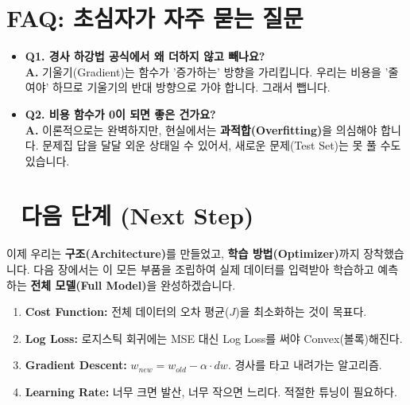 \documentclass[11pt,a4paper]{book}
\theoremstyle{definition}
\begin{document}
\section{FAQ: 초심자가 자주 묻는 질문}
\begin{itemize}
    \item \textbf{Q1. 경사 하강법 공식에서 왜 더하지 않고 빼나요?} \\
    \textbf{A.} 기울기(Gradient)는 함수가 '증가하는' 방향을 가리킵니다. 우리는 비용을 '줄여야' 하므로 기울기의 반대 방향으로 가야 합니다. 그래서 뺍니다.
    
    \item \textbf{Q2. 비용 함수가 0이 되면 좋은 건가요?} \\
    \textbf{A.} 이론적으로는 완벽하지만, 현실에서는 \textbf{과적합(Overfitting)}을 의심해야 합니다. 문제집 답을 달달 외운 상태일 수 있어서, 새로운 문제(Test Set)는 못 풀 수도 있습니다.
\end{itemize}

\section*{🔗 다음 단계 (Next Step)}
이제 우리는 \textbf{구조(Architecture)}를 만들었고, \textbf{학습 방법(Optimizer)}까지 장착했습니다. 
다음 장에서는 이 모든 부품을 조립하여 실제 데이터를 입력받아 학습하고 예측하는 \textbf{전체 모델(Full Model)}을 완성하겠습니다.

\vspace{0.5cm}

\begin{summarybox}[title={단원 요약 (Cheat Sheet)}]
\begin{enumerate}
    \item \textbf{Cost Function:} 전체 데이터의 오차 평균($J$)을 최소화하는 것이 목표다.
    \item \textbf{Log Loss:} 로지스틱 회귀에는 MSE 대신 Log Loss를 써야 Convex(볼록)해진다.
    \item \textbf{Gradient Descent:} $w_{new} = w_{old} - \alpha \cdot dw$. 경사를 타고 내려가는 알고리즘.
    \item \textbf{Learning Rate:} 너무 크면 발산, 너무 작으면 느리다. 적절한 튜닝이 필요하다.
\end{enumerate}
\end{summarybox}


\end{document}
